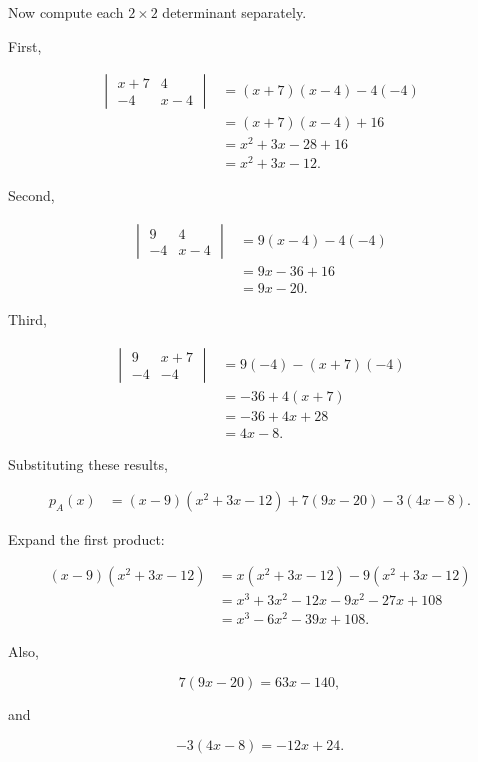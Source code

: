 \documentclass[11pt]{article}
\begin{document}
Now compute each \(2\times2\) determinant separately.

First,

\[
\begin{aligned}
\begin{vmatrix}
x+7&4\\
-4&x-4
\end{vmatrix}
&=
(x+7)(x-4)-4(-4)\\
&=
(x+7)(x-4)+16\\
&=
x^2+3x-28+16\\
&=
x^2+3x-12.
\end{aligned}
\]

Second,

\[
\begin{aligned}
\begin{vmatrix}
9&4\\
-4&x-4
\end{vmatrix}
&=
9(x-4)-4(-4)\\
&=
9x-36+16\\
&=
9x-20.
\end{aligned}
\]

Third,

\[
\begin{aligned}
\begin{vmatrix}
9&x+7\\
-4&-4
\end{vmatrix}
&=
9(-4)-(x+7)(-4)\\
&=
-36+4(x+7)\\
&=
-36+4x+28\\
&=
4x-8.
\end{aligned}
\]

Substituting these results,

\[
\begin{aligned}
p_A(x)
&=
(x-9)(x^2+3x-12)
+
7(9x-20)
-
3(4x-8).
\end{aligned}
\]

Expand the first product:

\[
\begin{aligned}
(x-9)(x^2+3x-12)
&=
x(x^2+3x-12)
-
9(x^2+3x-12)\\
&=
x^3+3x^2-12x
-
9x^2-27x+108\\
&=
x^3-6x^2-39x+108.
\end{aligned}
\]

Also,

\[
7(9x-20)=63x-140,
\]

and

\[
-3(4x-8)=-12x+24.
\]
\end{document}
